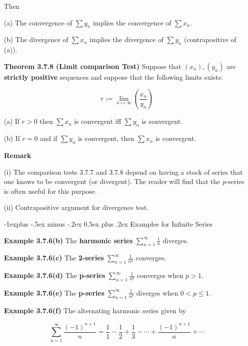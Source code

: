 \documentclass[10pt,landscape]{article}
\makeatletter
\renewcommand{\subsection}{\@startsection{subsection}{2}{0mm}%
                                {-1explus -.5ex minus -.2ex}%
                                {0.5ex plus .2ex}%
                                {\normalfont\normalsize\bfseries}}
\makeatother
\begin{document}
\begin{multicols}{4}
Then 

(a) The convergence of $\sum y_n$ implies the convergence of $\sum x_n$.

(b) The divergence of $\sum x_n$ implies the divergence of $\sum y_n$ (contrapositive of (a)).

\textbf{Theorem 3.7.8 (Limit comparison Test)} Suppose that $(x_n), (y_n)$ are \textbf{strictly positive} sequences and suppose that the following limits exists:

$$
r := \underset{n \mapsto \infty}{\lim} (\frac{x_n}{y_n})
$$

(a) If $r > 0$ then $\sum x_n$ is convergent iff $\sum y_n$ is convergent.

(b) If $r = 0$ and if $\sum y_n$ is convergent, then $\sum x_n$ is convergent.

\textbf{Remark} 

(i) The comparison tests 3.7.7 and 3.7.8 depend on having a stock of series that one knows to be convergent (or divergent). The reader will find that the \textit{p}-series is often useful for this purpose.

(ii) Contrapositive argument for divergence test.



\subsection{Examples for Infinite Series}

\textbf{Example 3.7.6(b)} The \textbf{harmonic series} $\sum^{\infty}_{n=1} \frac{1}{n}$ diverges.

\textbf{Example 3.7.6(c)} The \textbf{2-series} $\sum^{\infty}_{n=1} \frac{1}{n^2}$ converges.

\textbf{Example 3.7.6(d)} The \textbf{p-series} $\sum^{\infty}_{n=1} \frac{1}{n^p}$ converges when $p > 1$.

\textbf{Example 3.7.6(e)} The \textbf{p-series} $\sum^{\infty}_{n=1} \frac{1}{n^p}$ diverges when $0 < p \leq 1$.

\textbf{Example 3.7.6(f)} The alternating harmonic series given by 

$$
\sum_{n=1}^{\infty} \frac{(-1)^{n+1}}{n}=\frac{1}{1}-\frac{1}{2}+\frac{1}{3}-\cdots+\frac{(-1)^{n+1}}{n}+\cdots
$$


\end{multicols}
\end{document}
